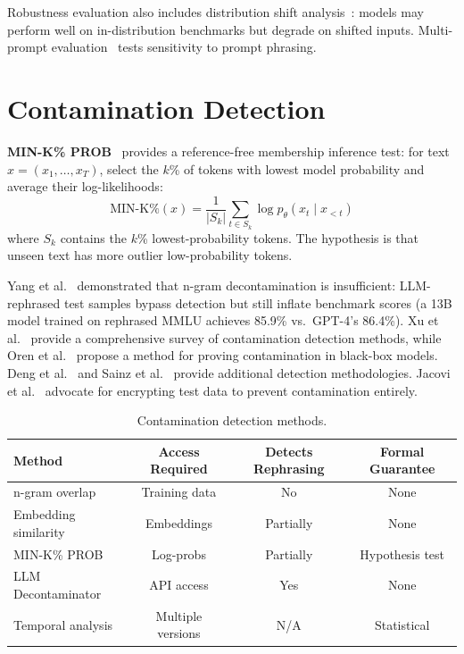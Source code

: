 \documentclass[11pt]{article}
\begin{document}
Robustness evaluation also includes distribution shift analysis~\cite{recht2019imagenet,rabanser2019failing}: models may perform well on in-distribution benchmarks but degrade on shifted inputs. Multi-prompt evaluation~\cite{mizrahi2024stateofwhat} tests sensitivity to prompt phrasing.

\section{Contamination Detection}
\label{sec:contamination}

\textbf{MIN-K\% PROB}~\cite{shi2023detecting} provides a reference-free membership inference test: for text $x = (x_1, \ldots, x_T)$, select the $k$\% of tokens with lowest model probability and average their log-likelihoods:
\begin{equation}
\text{MIN-K\%}(x) = \frac{1}{|S_k|} \sum_{t \in S_k} \log p_\theta(x_t \mid x_{<t})
\end{equation}
where $S_k$ contains the $k$\% lowest-probability tokens. The hypothesis is that unseen text has more outlier low-probability tokens.

Yang et al.~\cite{yang2023rethinking} demonstrated that n-gram decontamination is insufficient: LLM-rephrased test samples bypass detection but still inflate benchmark scores (a 13B model trained on rephrased MMLU achieves 85.9\% vs.\ GPT-4's 86.4\%). Xu et al.~\cite{xu2024contamination} provide a comprehensive survey of contamination detection methods, while Oren et al.~\cite{oren2024contamination} propose a method for proving contamination in black-box models. Deng et al.~\cite{deng2024contamination} and Sainz et al.~\cite{sainz2024contamination} provide additional detection methodologies. Jacovi et al.~\cite{jacovi2023stop} advocate for encrypting test data to prevent contamination entirely.

\begin{table}[h]
\centering
\caption{Contamination detection methods.}
\small
\begin{tabular}{@{}lccc@{}}
\toprule
\textbf{Method} & \textbf{Access Required} & \textbf{Detects Rephrasing} & \textbf{Formal Guarantee} \\
\midrule
n-gram overlap & Training data & No & None \\
Embedding similarity & Embeddings & Partially & None \\
MIN-K\% PROB & Log-probs & Partially & Hypothesis test \\
LLM Decontaminator & API access & Yes & None \\
Temporal analysis & Multiple versions & N/A & Statistical \\
\bottomrule
\end{tabular}
\end{table}
\end{document}
